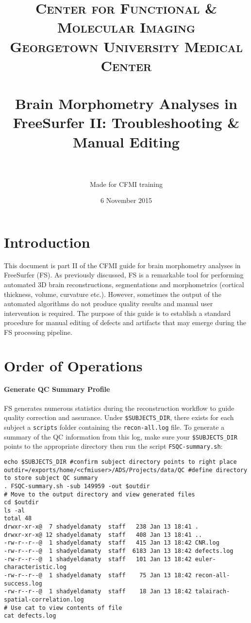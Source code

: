 \documentclass[paper=a4, fontsize=11pt]{scrartcl} %
\title{	
\normalfont \normalsize 
\textsc{Center for Functional \& Molecular Imaging \\ Georgetown University Medical Center} \\ [25pt] %
\horrule{0.5pt} \\[0.4cm] %
\huge Brain Morphometry Analyses in FreeSurfer II:  Troubleshooting \& Manual Editing  \\ %
\horrule{2pt} \\[0.5cm] %
}
\author{Made for CFMI training} %
\date{\normalsize 6 November 2015} %
\numberwithin{equation}{section} %
\numberwithin{figure}{section} %
\numberwithin{table}{section} %
\begin{document}
\maketitle %


\section{Introduction}  This document is part II of the CFMI guide for brain morphometry analyses in FreeSurfer (FS).  As previously discussed, FS is a remarkable tool for performing automated 3D brain  reconstructions, segmentations and morphometrics (cortical thickness, volume, curvature etc.).  However, sometimes the output of the automated algorithms do not produce quality results and manual user intervention is required.  The purpose of this guide is to establish a standard procedure for manual editing of defects and artifacts that may emerge during the FS processing pipeline.


\section{Order of Operations} 
\paragraph{Generate QC Summary Profile} FS generates numerous statistics during the reconstruction workflow to guide quality correction and assurance. Under \texttt{\$SUBJECTS\_DIR}, there exists for each subject a \texttt{scripts} folder containing the \texttt{recon-all.log} file.  To generate a summary of the QC information from this log, make sure your \texttt{\$SUBJECTS\_DIR} points to the appropriate directory then run the script \texttt{FSQC-summary.sh}:

\begin{lstlisting}
echo $SUBJECTS_DIR #confirm subject directory points to right place
outdir=/exports/home/<cfmiuser>/ADS/Projects/data/QC #define directory to store subject QC summary
. FSQC-summary.sh -sub 149959 -out $outdir
# Move to the output directory and view generated files
cd $outdir
ls -al
total 48
drwxr-xr-x@  7 shadyeldamaty  staff   238 Jan 13 18:41 .
drwxr-xr-x@ 12 shadyeldamaty  staff   408 Jan 13 18:41 ..
-rw-r--r--@  1 shadyeldamaty  staff   415 Jan 13 18:42 CNR.log
-rw-r--r--@  1 shadyeldamaty  staff  6183 Jan 13 18:42 defects.log
-rw-r--r--@  1 shadyeldamaty  staff   101 Jan 13 18:42 euler-characteristic.log
-rw-r--r--@  1 shadyeldamaty  staff    75 Jan 13 18:42 recon-all-success.log
-rw-r--r--@  1 shadyeldamaty  staff    18 Jan 13 18:42 talairach-spatial-correlation.log
# Use cat to view contents of file
cat defects.log
\end{lstlisting}
\end{document}
